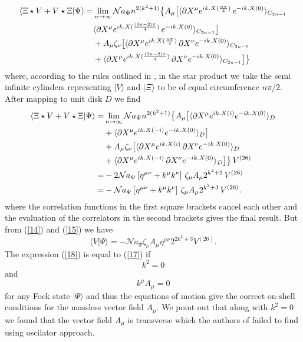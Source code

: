 \documentclass[a4paper,12pt]{article}
\begin{document}
\begin{align}
\langle \Xi\star V+ V\star\Xi|\Psi\rangle=&
\lim_{n\to\infty}\mathcal{N}a_\Psi n^{2(k^2+1)}
\bigl\{\bigr.
A_\mu\bigl[\bigr.
\langle\partial X^\mu e^{ik.X(\frac{n\pi}{4})}\,e^{-ik.X(0)}
\rangle_{C_{2n-1}}
\notag \\
&
\langle\partial X^\mu e^{ik.X(\frac{(3n-2)\pi}{4})}\,e^{-ik.X(0)}
\rangle_{C_{2n-1}}
\bigl. \bigr] \notag \\
&
+A_\mu\zeta_\nu\bigl[\bigr.
\langle\partial X^\mu e^{ik.X(\frac{n\pi}{4})}
\,\partial X^\nu e^{-ik.X(0)}
\rangle_{C_{2n-1}} 
\notag \\
& +
\langle\partial X^\mu e^{ik.X(\frac{(3n-2)\pi}{4})}
\,\partial X^\nu e^{-ik.X(0)}
\rangle_{C_{2n-1}}\bigl. \bigr]
\bigl.\bigr\}
\label{16}
\end{align}
where, according to the rules outlined in \cite{rv}, in the star product we 
take the semi infinite cylinders representing $|V\rangle$ and $|\Xi\rangle$
to be of equal circumference $n\pi/2$. After mapping to unit disk $D$ we find
\begin{align}
\langle \Xi\star V+ V\star\Xi|\Psi\rangle=&
\lim_{n\to\infty}\mathcal{N}a_\Psi n^{2(k^2+1)}
\bigl\{
A_\mu\bigl[
\langle\partial X^\mu e^{ik.X(i)}e^{-ik.X(0)}
\rangle_D
\bigr. \bigr.\notag \\
&
+\bigl.
\langle\partial X^\mu e^{ik.X(-i)}e^{-ik.X(0)}
\rangle_D
\bigr] \notag \\
&
+A_\mu\zeta_\nu
\bigl[
\langle\partial X^\mu e^{ik.X(i)}
\,\partial X^\nu e^{-ik.X(0)}
\rangle_D \bigr.
\notag \\
& +\bigl.\bigl.
\langle\partial X^\mu e^{ik.X(-i)}
\,\partial X^\nu e^{-ik.X(0)}
\rangle_D\bigr]
\bigr\}\, V^{(26)}
\notag \\
=&
-2\mathcal{N}a_\Psi \left[\eta^{\mu\nu}+k^\mu k^\nu\right]
\,\zeta_\mu A_\mu 2^{k^2+2}\, V^{(26)}
\notag \\
=& -\mathcal{N}a_\Psi \left[\eta^{\mu\nu}+k^\mu k^\nu\right]
\,\zeta_\mu A_\mu 2^{k^2+3}\, V^{(26)}.
\label{17}
\end{align}
where the correlation functions in the first square brackets cancel
each other and the evaluation of the correlators in the second
brackets gives the final result.
But from (\ref{14}) and (\ref{15}) we have
\begin{equation}
\langle V|\Psi\rangle=
-\mathcal{N}a_\Psi \zeta_\nu A_\mu
\eta^{\mu\nu} 2^{2k^2+3}V^{(26)}.
\label{18}
\end{equation}
The expression (\ref{18}) is equal to (\ref{17}) if
\begin{equation}
k^2=0 
\label{19}
\end{equation}
and
\begin{equation}
k^\mu A_\mu=0
\label{20}
\end{equation}
for any Fock state $|\Psi\rangle$ and thus the equations of motion
give the correct on-shell conditions
for the massless vector field $A_\mu$. We point out that along with $k^2=0$ we
found that the vector field $A_\mu$ is transverse which the authors of 
\cite{hk} failed to find using oscilator approach.
\end{document}
